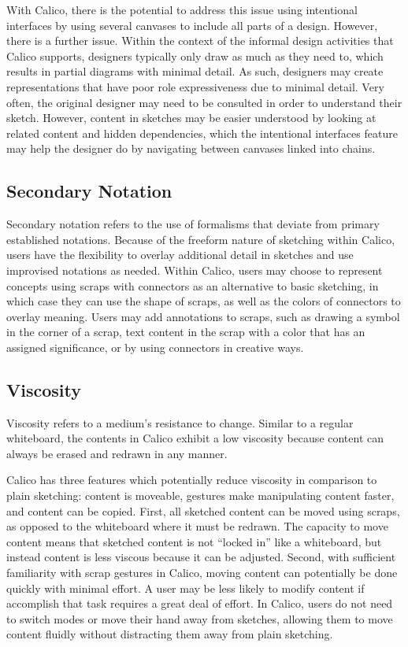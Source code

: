\documentclass[12pt,fleqn]{ucithesis}
\begin{document}
With Calico, there is the potential to address this issue using intentional interfaces by using several canvases to include all parts of a design. However, there is a further issue. Within the context of the informal design activities that Calico supports, designers typically only draw as much as they need to, which results in partial diagrams with minimal detail. As such, designers may create representations that have poor role expressiveness due to minimal detail. Very often, the original designer may need to be consulted in order to understand their sketch. However, content in sketches may be easier understood by looking at related content and hidden dependencies, which the intentional interfaces feature may help the designer do by navigating between canvases linked into chains. 


\subsection{Secondary Notation}

Secondary notation refers to the use of formalisms that deviate from primary established notations. Because of the freeform nature of sketching within Calico, users have the flexibility to overlay additional detail in sketches and use improvised notations as needed. Within Calico, users may choose to represent concepts using scraps with connectors as an alternative to basic sketching, in which case they can use the shape of scraps, as well as the colors of connectors to overlay meaning. Users may add annotations to scraps, such as drawing a symbol in the corner of a scrap, text content in the scrap with a color that has an assigned significance, or by using connectors in creative ways.


\subsection{Viscosity}

Viscosity refers to a medium's resistance to change. Similar to a regular whiteboard, the contents in Calico exhibit a low viscosity because content can always be erased and redrawn in any manner. 

Calico has three features which potentially reduce viscosity in comparison to plain sketching: content is moveable, gestures make manipulating content faster, and content can be copied. First, all sketched content can be moved using scraps, as opposed to the whiteboard where it must be redrawn. The capacity to move content means that sketched content is not ``locked in'' like a whiteboard, but instead content is less viscous because it can be adjusted. Second, with sufficient familiarity with scrap gestures in Calico, moving content can potentially be done quickly with minimal effort. A user may be less likely to modify content if accomplish that task requires a great deal of effort. In Calico, users do not need to switch modes or move their hand away from sketches, allowing them to move content fluidly without distracting them away from plain sketching. 
\end{document}
